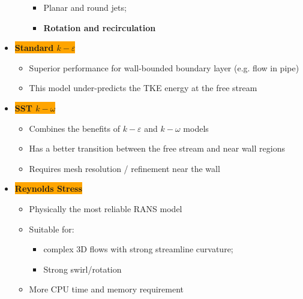 \begin{itemize}
\begin{itemize}
\begin{itemize}
            \item Planar and round jets;
            \item \textbf{Rotation and recirculation}
        \end{itemize}
    \end{itemize}
    \item \colorbox{orange}{\textbf{\color{white}Standard $k-\varepsilon$}}
    \begin{itemize}
        \item {\color{red}Superior performance for wall-bounded boundary layer (e.g. flow in pipe)}
        \item {\color{blue}This model under-predicts the TKE energy at the free stream}
    \end{itemize}
    \item \colorbox{orange}{\textbf{\color{white}SST $k-\omega$}}
    \begin{itemize}
        \item {\color{red}Combines the benefits of $k-\varepsilon$ and $k-\omega$ models}
        \item {\color{red}Has a better transition between the free stream and near wall regions}
        \item {\color{blue}Requires mesh resolution / refinement near the wall}
    \end{itemize}
    \item \colorbox{orange}{\textbf{\color{white}Reynolds Stress}}
    \begin{itemize}
        \item {\color{red}Physically the most reliable RANS model}
        \item {\color{red}Suitable for:}
        \begin{itemize}
            \item complex 3D flows with strong streamline curvature;
            \item Strong swirl/rotation
        \end{itemize}
        \item {\color{blue}More CPU time and memory requirement}
    \end{itemize}
\end{itemize}

